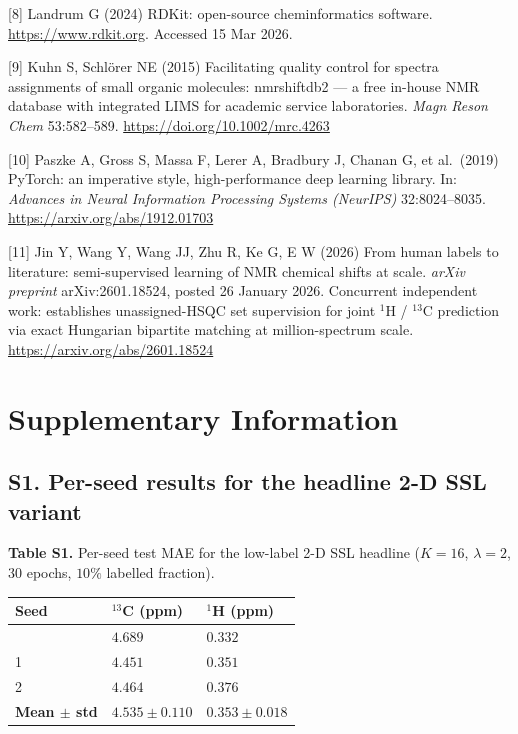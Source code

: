 \documentclass[
  11pt,
  a4paper,
]{article}
\newcounter{none} %
\begin{document}
{[}8{]} Landrum G (2024) RDKit: open-source cheminformatics software.
\url{https://www.rdkit.org}. Accessed 15 Mar 2026.

{[}9{]} Kuhn S, Schlörer NE (2015) Facilitating quality control for
spectra assignments of small organic molecules: nmrshiftdb2 --- a
free in-house NMR database with integrated LIMS for academic service
laboratories. \textit{Magn Reson Chem} 53:582--589.
\url{https://doi.org/10.1002/mrc.4263}

{[}10{]} Paszke A, Gross S, Massa F, Lerer A, Bradbury J, Chanan G,
et al.~(2019) PyTorch: an imperative style, high-performance deep
learning library. In: \textit{Advances in Neural Information
Processing Systems (NeurIPS)} 32:8024--8035.
\url{https://arxiv.org/abs/1912.01703}

{[}11{]} Jin Y, Wang Y, Wang JJ, Zhu R, Ke G, E W (2026) From human labels
to literature: semi-supervised learning of NMR chemical shifts at
scale. \textit{arXiv preprint} arXiv:2601.18524, posted 26 January
2026. Concurrent independent work: establishes unassigned-HSQC set
supervision for joint \(^{1}\)H / \(^{13}\)C prediction via exact
Hungarian bipartite matching at million-spectrum scale.
\url{https://arxiv.org/abs/2601.18524}

\endgroup

\section{Supplementary Information}\label{supplementary-information}

\subsection*{S1. Per-seed results for the headline 2-D SSL variant}

\textbf{Table S1.} Per-seed test MAE for the low-label 2-D SSL headline
(\(K=16\), \(\lambda=2\), 30 epochs, \(10\%\) labelled fraction).

{\def\LTcaptype{none} %
\begin{longtable}[]{@{}lll@{}}
\toprule\noalign{}
Seed & \(^{13}\)C (ppm) & \(^{1}\)H (ppm) \\
\midrule\noalign{}
\endhead
\bottomrule\noalign{}
\endlastfoot
0 & \(4.689\) & \(0.332\) \\
1 & \(4.451\) & \(0.351\) \\
2 & \(4.464\) & \(0.376\) \\
\textbf{Mean \(\pm\) std} & \textbf{\(4.535 \pm 0.110\)} & \textbf{\(0.353 \pm 0.018\)} \\
\end{longtable}
}
\end{document}
